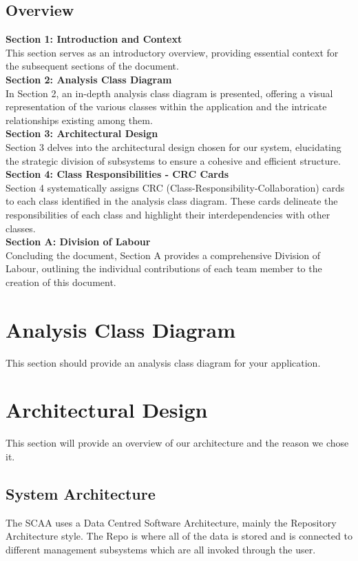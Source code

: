 \documentclass[]{article}
\begin{document}
\subsection{Overview}
\label{sub:overview}
\textbf{Section 1: Introduction and Context} \\
This section serves as an introductory overview, providing essential context for the subsequent sections of the document. \\[12pt]
\textbf{Section 2: Analysis Class Diagram} \\
In Section 2, an in-depth analysis class diagram is presented, offering a visual representation of the various classes within the application and the intricate relationships existing among them.\\[12pt]
\textbf{Section 3: Architectural Design} \\
Section 3 delves into the architectural design chosen for our system, elucidating the strategic division of subsystems to ensure a cohesive and efficient structure.\\[12pt]
\textbf{Section 4: Class Responsibilities - CRC Cards} \\
Section 4 systematically assigns CRC (Class-Responsibility-Collaboration) cards to each class identified in the analysis class diagram. These cards delineate the responsibilities of each class and highlight their interdependencies with other classes.\\[12pt]
\textbf{Section A: Division of Labour} \\
Concluding the document, Section A provides a comprehensive Division of Labour, outlining the individual contributions of each team member to the creation of this document.


\section{Analysis Class Diagram}
\label{sec:analysis_class_diagram}
This section should provide an analysis class diagram for your application.


\section{Architectural Design}
\label{sec:architectural_design}
This section will provide an overview of our architecture and the reason we chose it.
\subsection{System Architecture}
\label{sub:system_architecture}
The SCAA uses a Data Centred Software Architecture, mainly the Repository Architecture style. The Repo is where all of the data is stored and is connected to different management subsystems which are all invoked through the user. 
\end{document}
